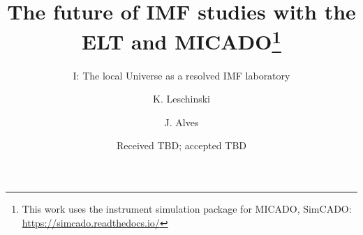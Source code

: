 \documentclass{aa}
\begin{document}
  \title{The future of IMF studies with the ELT and MICADO\thanks{This work uses the instrument simulation package for MICADO, SimCADO: \url{https://simcado.readthedocs.io/}}}
  \subtitle{I: The local Universe as a resolved IMF laboratory}
  \author{K. Leschinski
     \and
          J. Alves
     }


  \date{Received TBD; accepted TBD}

\end{document}

